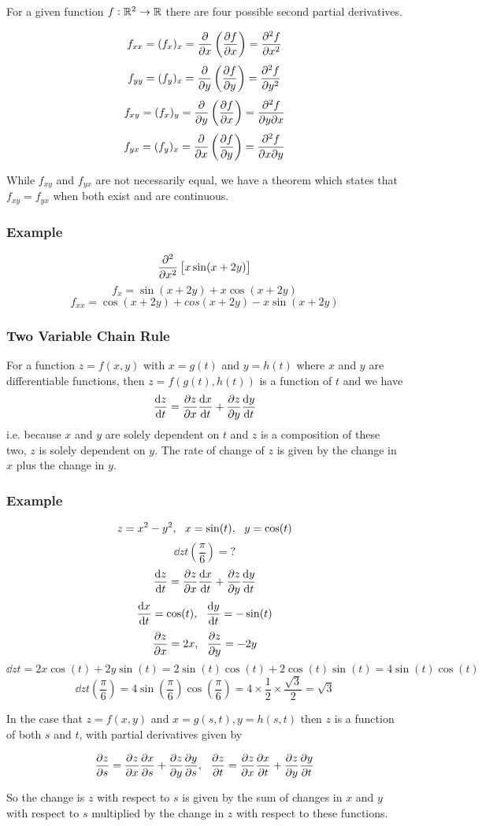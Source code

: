 \documentclass[12pt]{report}
\begin{document}
\begin{flushleft}
For a given function \(f : \mathbb{R}^2 \rightarrow \mathbb{R}\) there are four possible second
partial derivatives.

\[f_{xx} = (f_x)_x = \frac{\partial}{\partial x}\left(\frac{\partial f}{\partial x}\right) = \frac{\partial^2f}{\partial x^2}\]
\[f_{yy} = (f_y)_x = \frac{\partial}{\partial y}\left(\frac{\partial f}{\partial y}\right) = \frac{\partial^2f}{\partial y^2}\]
\[f_{xy} = (f_x)_y = \frac{\partial}{\partial y}\left(\frac{\partial f}{\partial x}\right)
= \frac{\partial^2f}{\partial y\partial x}\]
\[f_{yx} = (f_y)_x = \frac{\partial}{\partial x}\left(\frac{\partial f}{\partial y}\right)
= \frac{\partial^2f}{\partial x\partial y}\]

While \(f_{xy}\) and \(f_{yx}\) are not necessarily equal, we have a theorem
which states that \(f_{xy} = f_{yx}\) when both exist and are continuous.

\subsubsection*{Example}

\[\frac{\partial^2}{\partial x^2}\left[x\sin(x + 2y)\right]\]
\[f_x = \sin(x + 2y) + x\cos(x + 2y)\]
\[f_{xx} = \cos(x + 2y) + cos(x + 2y) - x\sin(x + 2y)\]

\subsubsection*{Two Variable Chain Rule}

For a function \(z = f(x, y)\) with \(x = g(t)\) and \(y = h(t)\) where \(x\)
and \(y\) are differentiable functions, then \(z = f(g(t), h(t))\) is a
function of \(t\) and we have
\[\frac{\mathrm{d}z}{\mathrm{d}t} = \frac{\partial z}{\partial x}\frac{\mathrm{d}x}{\mathrm{d}t} + \frac{\partial z}{\partial y}\frac{\mathrm{d}y}{\mathrm{d}t}\]
i.e. because \(x\) and \(y\) are solely dependent on \(t\) and \(z\) is a
composition of these two, \(z\) is solely dependent on \(y\). The rate of
change of \(z\) is given by the change in \(x\) plus the change in \(y\).

\subsubsection*{Example}

\[z = x^2 - y^2, \:\:\: x = \sin(t), \:\:\: y = \cos(t)\]
\[\dd{z}{t}\left(\frac{\pi}{6}\right) = ?\]
\[\frac{\mathrm{d}z}{\mathrm{d}t} = \frac{\partial z}{\partial x}\frac{\mathrm{d}x}{\mathrm{d}t} + \frac{\partial z}{\partial y}\frac{\mathrm{d}y}{\mathrm{d}t}\]
\[\frac{\mathrm{d}x}{\mathrm{d}t} = \cos(t), \:\:\: \frac{\mathrm{d}y}{\mathrm{d}t} = -\sin(t)\]
\[\frac{\partial z}{\partial x} = 2x, \:\:\: \frac{\partial z}{\partial y} = -2y\]
\[\dd{z}{t} = 2x\cos(t) + 2y\sin(t) = 2\sin(t)\cos(t) + 2\cos(t)\sin(t)
= 4\sin(t)\cos(t)\]
\[\dd{z}{t}\left(\frac{\pi}{6}\right) =
4\sin\left(\frac{\pi}{6}\right)\cos\left(\frac{\pi}{6}\right)
= 4\times\frac{1}{2}\times\frac{\sqrt{3}}{2} = \sqrt{3}\]

\bigskip

In the case that \(z = f(x, y)\) and \(x = g(s, t), y = h(s, t)\) then \(z\) is
a function of both \(s\) and \(t\), with partial derivatives given by

\[\frac{\partial z}{\partial s} = \frac{\partial z}{\partial x}\frac{\partial x}{\partial s} + \frac{\partial z}{\partial y}\frac{\partial y}{\partial s}, \:\:\:
\frac{\partial z}{\partial t} = \frac{\partial z}{\partial x}\frac{\partial x}{\partial t} + \frac{\partial z}{\partial y}\frac{\partial y}{\partial t}\]

So the change is \(z\) with respect to \(s\) is given by the sum of changes in
\(x\) and \(y\) with respect to \(s\) multiplied by the change in \(z\) with
respect to these functions.

\end{flushleft}
\end{document}
